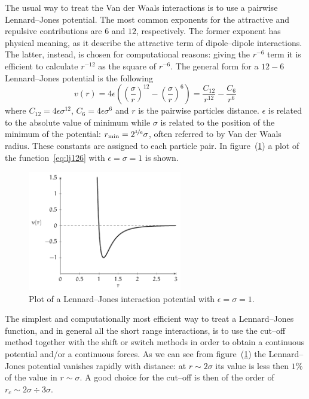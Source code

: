 The usual way to treat the Van der Waals interactions is to use a pairwise Lennard--Jones potential. The most
common exponents for the attractive and repulsive contributions are $6$ and $12$, respectively. The former exponent 
has physical meaning, as it describe the attractive term of dipole--dipole interactions. The latter, instead,
is chosen for computational reasons: giving the $r^{-6}$ term it is efficient to calculate $r^{-12}$ as the square
of $r^{-6}$. The general form for a $12-6$ Lennard--Jones potential is the following
\begin{equation}
	v(r) = 4\epsilon\left ( \left ( \frac{\sigma}{r}\right )^{12}  - \left ( \frac{\sigma}{r} \right )^6 \right ) = \frac{C_{12}}{r^{12}} - \frac{C_{6}}{r^{6}}
	\label{eq:lj126}
\end{equation}
where $C_{12} = 4\epsilon\sigma^{12}$, $C_{6} = 4\epsilon\sigma^{6}$ and $r$ is the pairwise particles distance.
$\epsilon$ is related to the absolute value of minimum while $\sigma$ is related to the position of the minimum
of the potential: $r_{\text{min}} = 2^{\nicefrac{1}{6}}\sigma$, often referred to by Van der Waals radius. These
constants are assigned to each particle pair. In figure~(\ref{fig:LG12511}) a plot of the function~\eqref{eq:lj126} with $\epsilon = \sigma = 1$ is shown.
\begin{figure}[!ht]
\centering
	\includegraphics[width=0.6\textwidth]{./img/LJ126/LJ126}
	\caption{Plot of a Lennard--Jones interaction potential with $\epsilon = \sigma = 1$.}
	\label{fig:LG12511}
\end{figure}

The simplest and computationally most efficient way to treat a Lennard--Jones function, and in general all the
short range interactions, is to use the cut--off method together with the shift or switch methods in order to
obtain a continuous potential and/or a continuous forces. As we can see from figure~(\ref{fig:LG12511}) the
Lennard--Jones potential vanishes rapidly with distance: at $r \sim 2\sigma$ its value is less then $1\%$ of the
value in $r \sim \sigma$. A good choice for the cut--off is then of the order of $r_c \sim 2\sigma \div 3\sigma$.

